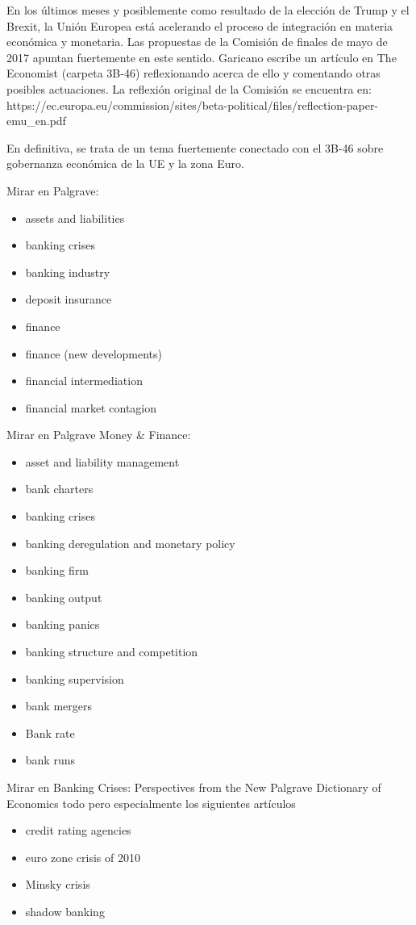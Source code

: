 \documentclass{nuevotema}
\begin{document}
En los últimos meses y posiblemente como resultado de la elección de Trump y el Brexit, la Unión Europea está acelerando el proceso de integración en materia económica y monetaria. Las propuestas de la Comisión de finales de mayo de 2017 apuntan fuertemente en este sentido. Garicano escribe un artículo en The Economist (carpeta 3B-46) reflexionando acerca de ello y comentando otras posibles actuaciones. La reflexión original de la Comisión se encuentra en: https://ec.europa.eu/commission/sites/beta-political/files/reflection-paper-emu\_en.pdf

En definitiva, se trata de un tema fuertemente conectado con el 3B-46 sobre gobernanza económica de la UE y la zona Euro.

\bibliografia

Mirar en Palgrave:

\begin{itemize}
	\item assets and liabilities
	\item banking crises
	\item banking industry
	\item deposit insurance
	\item finance
	\item finance (new developments)
	\item financial intermediation
	\item financial market contagion
\end{itemize}

Mirar en Palgrave Money \& Finance:

\begin{itemize}
	\item asset and liability management
	\item bank charters
	\item banking crises
	\item banking deregulation and monetary policy
	\item banking firm
	\item banking output
	\item banking panics
	\item banking structure and competition
	\item banking supervision
	\item bank mergers
	\item Bank rate
	\item bank runs
\end{itemize}

Mirar en Banking Crises: Perspectives from the New Palgrave Dictionary of Economics todo pero especialmente los siguientes artículos
\begin{itemize}
	\item credit rating agencies
	\item euro zone crisis of 2010
	\item Minsky crisis
	\item shadow banking
\end{itemize}
\end{document}
